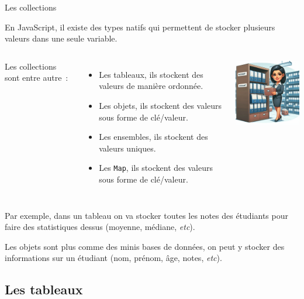 \documentclass{beamer}
\begin{document}
    \begin{frame}{Les collections}
        \begin{footnotesize}
            En JavaScript, il existe des types natifs qui permettent de stocker plusieurs valeurs dans une seule variable.
            \bigbreak
            \begin{columns}
                Les collections sont entre autre~:
                \begin{itemize}
                    \item Les tableaux, ils stockent des valeurs de manière ordonnée.
                    \item Les objets, ils stockent des valeurs sous forme de clé/valeur.
                    \item Les ensembles, ils stockent des valeurs uniques.
                    \item Les \lstinline{Map}, ils stockent des valeurs sous forme de clé/valeur.
                \end{itemize}
                \centering
                \includegraphics[width=5cm]{image/account-store}
            \end{columns}
            \flushleft
            Par exemple, dans un tableau on va stocker toutes les notes des étudiants pour faire des statistiques dessus (moyenne, médiane, \textit{etc}).

            Les objets sont plus comme des minis bases de données, on peut y stocker des informations sur un étudiant (nom, prénom, âge, notes, \textit{etc}).
        \end{footnotesize}
    \end{frame}

    \subsection{Les tableaux}\label{subsec:arrays}
\end{document}
